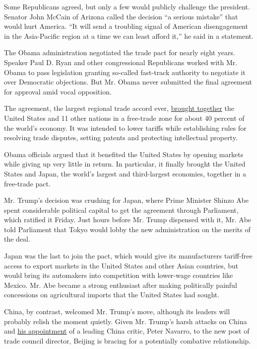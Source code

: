 Some Republicans agreed, but only a few would publicly challenge the
president. Senator John McCain of Arizona called the decision ``a
serious mistake'' that would hurt America. ``It will send a troubling
signal of American disengagement in the Asia-Pacific region at a time we
can least afford it,'' he said in a statement.

The Obama administration negotiated the trade pact for nearly eight
years. Speaker Paul D. Ryan and other congressional Republicans worked
with Mr. Obama to pass legislation granting so-called fast-track
authority to negotiate it over Democratic objections. But Mr. Obama
never submitted the final agreement for approval amid vocal opposition.

The agreement, the largest regional trade accord ever,
\href{https://www.nytimes.com/2015/06/15/world/asia/the-trans-pacific-trade-deal-and-a-presidents-legacy.html}{brought
together} the United States and 11 other nations in a free-trade zone
for about 40 percent of the world's economy. It was intended to lower
tariffs while establishing rules for resolving trade disputes, setting
patents and protecting intellectual property.

Obama officials argued that it benefited the United States by opening
markets while giving up very little in return. In particular, it finally
brought the United States and Japan, the world's largest and
third-largest economies, together in a free-trade pact.

Mr. Trump's decision was crushing for Japan, where Prime Minister Shinzo
Abe spent considerable political capital to get the agreement through
Parliament, which ratified it Friday. Just hours before Mr. Trump
dispensed with it, Mr. Abe told Parliament that Tokyo would lobby the
new administration on the merits of the deal.

Japan was the last to join the pact, which would give its manufacturers
tariff-free access to export markets in the United States and other
Asian countries, but would bring its automakers into competition with
lower-wage countries like Mexico. Mr. Abe became a strong enthusiast
after making politically painful concessions on agricultural imports
that the United States had sought.

China, by contrast, welcomed Mr. Trump's move, although its leaders will
probably relish the moment quietly. Given Mr. Trump's harsh attacks on
China and
\href{https://www.nytimes.com/2016/12/21/us/politics/peter-navarro-carl-icahn-trump-china-trade.html}{his
appointment} of a leading China critic, Peter Navarro, to the new post
of trade council director, Beijing is bracing for a potentially
combative relationship.

